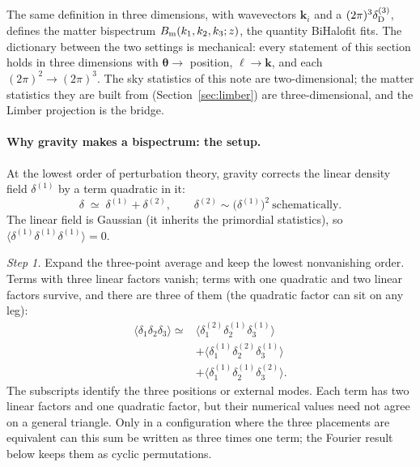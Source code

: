 \documentclass[11pt]{article}
\newcommand{\btheta}{\boldsymbol{\theta}}
\newcommand{\bell}{\boldsymbol{\ell}}
\newcommand{\bk}{\boldsymbol{k}}
\numberwithin{equation}{section}
\begin{document}
The same definition in three dimensions, with wavevectors $\bk_i$ and
a $(2\pi)^3 \delta_{\rm D}^{(3)}$, defines the matter bispectrum
$B_{\rm m}(k_1,k_2,k_3;z)$, the quantity BiHalofit fits.  The
dictionary between the two settings is mechanical: every statement
of this section holds in three dimensions with $\btheta \to$
position, $\bell \to \bk$, and each $(2\pi)^2 \to (2\pi)^3$.  The
sky statistics of this note are two-dimensional; the matter
statistics they are built from (Section~\ref{sec:limber}) are
three-dimensional, and the Limber projection is the bridge.

\paragraph{Why gravity makes a bispectrum: the setup.}
At the lowest order of perturbation theory, gravity corrects the
linear density field $\delta^{(1)}$ by a term quadratic in it:
\begin{equation}
  \delta \;\simeq\; \delta^{(1)} + \delta^{(2)},
  \qquad
  \delta^{(2)} \sim \bigl(\delta^{(1)}\bigr)^2
  \ \text{schematically}.
  \label{eq:deltaexpand}
\end{equation}
The linear field is Gaussian (it inherits the primordial statistics),
so $\langle \delta^{(1)}\delta^{(1)}\delta^{(1)}\rangle = 0$.

\emph{Step 1.}  Expand the three-point average and keep the lowest
nonvanishing order.  Terms with three linear factors vanish; terms
with one quadratic and two linear factors survive, and there are
three of them (the quadratic factor can sit on any leg):
\begin{equation}
\begin{split}
 \langle\delta_1\delta_2\delta_3\rangle \simeq{}&
 \langle\delta_1^{(2)}\delta_2^{(1)}\delta_3^{(1)}\rangle\\
 &+\langle\delta_1^{(1)}\delta_2^{(2)}\delta_3^{(1)}\rangle\\
 &+\langle\delta_1^{(1)}\delta_2^{(1)}\delta_3^{(2)}\rangle .
\end{split}
  \label{eq:treeidea}
\end{equation}
The subscripts identify the three positions or external modes. Each
term has two linear factors and one quadratic factor, but their numerical
values need not agree on a general triangle. Only in a configuration
where the three placements are equivalent can this sum be written as
three times one term; the Fourier result below keeps them as cyclic
permutations.
\end{document}
